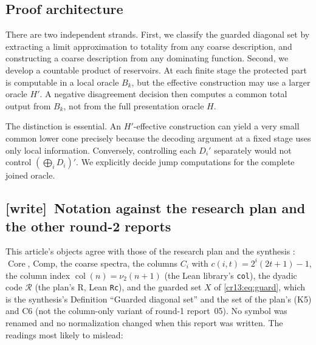 \documentclass[11pt,letterpaper]{article}
\theoremstyle{definition}
\theoremstyle{remark}\newtheorem{remark}[theorem]{Remark}
\numberwithin{equation}{section}
\newcommand{\Core}{\operatorname{Core}}
\newcommand{\Comp}{\mathrm{Comp}}
\newcommand{\Rc}{\mathcal R}
\newcommand{\col}{\operatorname{col}}
\newcommand{\wtag}{\textup{[write]}}
\begin{document}
\subsection{Proof architecture}
There are two independent strands. First, we classify the guarded diagonal set by extracting a limit approximation to totality from any coarse description, and constructing a coarse description from any dominating function. Second, we develop a countable product of reservoirs. At each finite stage the protected part is computable in a local oracle $B_k$, but the effective construction may use a larger oracle $H'$. A negative disagreement decision then computes a common total output from $B_k$, not from the full presentation oracle $H$.

The distinction is essential. An $H'$-effective construction can yield a very small common lower cone precisely because the decoding argument at a fixed stage uses only local information. Conversely, controlling each $D_i'$ separately would not control $(\bigoplus_iD_i)'$. We explicitly decide jump computations for the complete joined oracle.

\subsection{\wtag\ Notation against the research plan and the other round-2 reports}
\label{cr13:sec:wnotation}
This article's objects agree with those of the research plan and the synthesis \cite{Plan,Synthesis}: $\Core$, $\Comp$, the coarse spectra, the columns $C_i$ with $c(i,t)=2^i(2t+1)-1$, the column index $\col(n)=\nu_2(n+1)$ (the Lean library's \texttt{col}), the dyadic code $\Rc$ (the plan's $\mathrm R$, Lean \texttt{Rc}), and the guarded set $X$ of \eqref{cr13:eq:guard}, which is the synthesis's Definition ``Guarded diagonal set'' and the set of the plan's (K5) and C6 (not the column-only variant of round-1 report~05). No symbol was renamed and no normalization changed when this report was written. The readings most likely to mislead:
\end{document}
